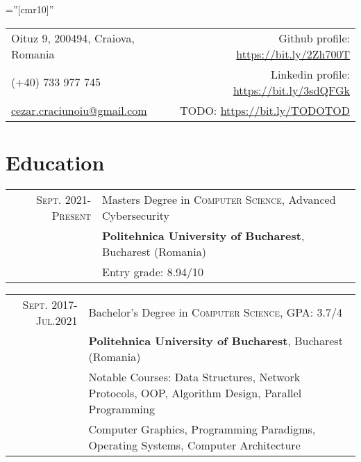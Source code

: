 \documentclass[a4paper,10pt]{article}
\begin{document}
\pagestyle{empty}    %
\font\fb=''[cmr10]'' %


\begin{tabular}{lr}
    \footnotesize{Oituz 9, 200494, Craiova, Romania \hspace{230pt}} & \footnotesize{Github profile: \url{https://bit.ly/2Zh700T}} \\
    \footnotesize{(+40) 733 977 745} & \footnotesize{Linkedin profile: \url{https://bit.ly/3sdQFGk}} \\
    \footnotesize{\href{mailto:cezar.craciunoiu@gmail.com}{cezar.craciunoiu@gmail.com}} & \footnotesize{TODO: \url{https://bit.ly/TODOTOD}} \\
\end{tabular}		

\par{\bigskip\par}

\section{Education}
\begin{tabular}{rl}	
	\textsc{Sept.} 2021-\textsc{Present}& Masters Degree in \textsc{Computer Science}, Advanced Cybersecurity \\&
	\normalsize\textbf{Politehnica University of Bucharest}, Bucharest (Romania) \\&
	\footnotesize{Entry grade: 8.94/10}
\end{tabular}

\begin{tabular}{rl}	
	\textsc{Sept.} 2017-\textsc{Jul.}2021& Bachelor's Degree in \textsc{Computer Science}, GPA: 3.7/4 \\&
	\normalsize\textbf{Politehnica University of Bucharest}, Bucharest (Romania)\\&
	\footnotesize{Notable Courses: Data Structures, Network Protocols, OOP, Algorithm Design, Parallel Programming} \\&
	\footnotesize{Computer Graphics, Programming Paradigms, Operating Systems, Computer Architecture}
\end{tabular}

\end{document}

